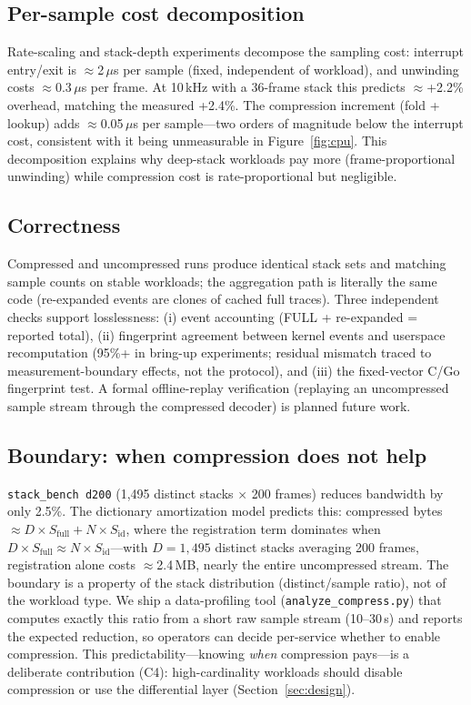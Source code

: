 \documentclass[letterpaper,twocolumn,10pt]{article}
\begin{document}
\subsection{Per-sample cost decomposition}
Rate-scaling and stack-depth experiments decompose the sampling cost:
interrupt entry/exit is $\approx$2$\,\mu$s per sample (fixed, independent
of workload), and unwinding costs $\approx$0.3$\,\mu$s per frame. At
10\,kHz with a 36-frame stack this predicts $\approx$+2.2\% overhead,
matching the measured +2.4\%. The compression increment (fold + lookup)
adds $\approx$0.05$\,\mu$s per sample---two orders of magnitude below
the interrupt cost, consistent with it being unmeasurable in
Figure~\ref{fig:cpu}. This decomposition explains why deep-stack
workloads pay more (frame-proportional unwinding) while compression cost
is rate-proportional but negligible.

\subsection{Correctness}
Compressed and uncompressed runs produce identical stack sets and matching
sample counts on stable workloads; the aggregation path is literally the
same code (re-expanded events are clones of cached full traces). Three
independent checks support losslessness: (i) event accounting
(FULL + re-expanded = reported total), (ii) fingerprint agreement between
kernel events and userspace recomputation (95\%+ in bring-up experiments;
residual mismatch traced to measurement-boundary effects, not the
protocol), and (iii) the fixed-vector C/Go fingerprint test. A formal
offline-replay verification (replaying an uncompressed sample stream
through the compressed decoder) is planned future work.

\subsection{Boundary: when compression does not help}
\label{sec:boundary}
\texttt{stack\_bench d200} (1{,}495 distinct stacks $\times$ 200 frames)
reduces bandwidth by only 2.5\%. The dictionary amortization model
predicts this: compressed bytes $\approx D\times S_\text{full} + N\times
S_\text{id}$, where the registration term dominates when
$D\times S_\text{full} \approx N\times S_\text{id}$---with $D=1{,}495$
distinct stacks averaging 200 frames, registration alone costs
$\approx$2.4\,MB, nearly the entire uncompressed stream. The boundary is a
property of the stack distribution (distinct/sample ratio), not of the
workload type. We ship a data-profiling tool
(\texttt{analyze\_compress.py}) that computes exactly this ratio from a
short raw sample stream (10--30\,s) and reports the expected reduction, so
operators can decide per-service whether to enable compression. This
predictability---knowing \emph{when} compression pays---is a deliberate
contribution (C4): high-cardinality workloads should disable compression
or use the differential layer (Section~\ref{sec:design}).
\end{document}
